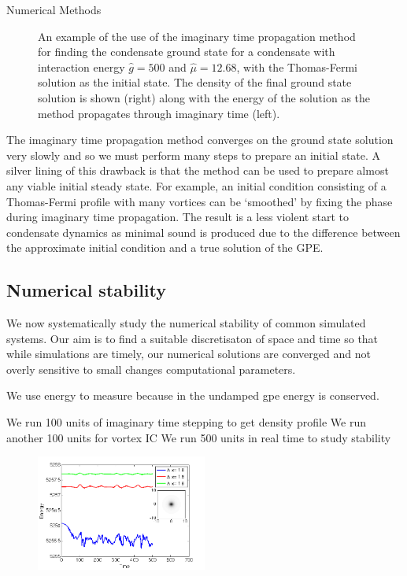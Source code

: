 \begin{chapter}{\label{cha:numerics}Numerical Methods}
\begin{figure}
	\caption{An example of the use of the imaginary time propagation method for finding the condensate ground state for a condensate with interaction energy $\hat{g}=500$ and $\hat{\mu}=12.68$, with the Thomas-Fermi solution as the initial state. The density of the final ground state solution is shown (right) along with the energy of the solution as the method propagates through imaginary time (left).}
\end{figure}
The imaginary time propagation method converges on the ground state solution very slowly and so we must perform many steps to prepare an initial state. A silver lining of this drawback is that the method can be used to prepare almost any viable initial steady state. For example, an initial condition consisting of a Thomas-Fermi profile with many vortices can be `smoothed' by fixing the phase during imaginary time propagation. The result is a less violent start to condensate dynamics as minimal sound is produced due to the difference between the approximate initial condition and a true solution of the GPE.

	\subsection{\label{section:numericalParams} Numerical stability}
	We now systematically study the numerical stability of common simulated systems. Our aim is to find a suitable discretisaton of space and time so that while simulations are timely, our numerical solutions are converged and not overly sensitive to small changes computational parameters.

	We use energy to measure because in the undamped gpe energy is conserved.

	We run 100 units of imaginary time stepping to get density profile
	We run another 100 units for vortex IC
	We run 500 units in real time to study stability


\begin{figure}
	\centering
	\includegraphics[width=0.5\textwidth]{numerics/figures/homg_energy_cons.png}
\end{figure}


\end{chapter}
